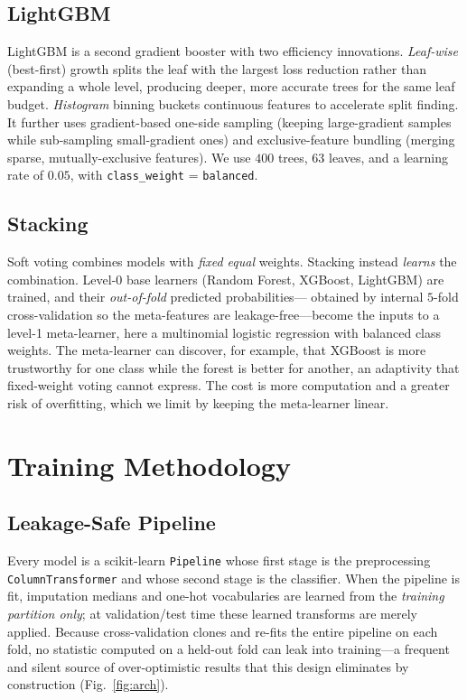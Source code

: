 \documentclass[conference]{IEEEtran}
\begin{document}
\subsection{LightGBM}
LightGBM is a second gradient booster with two efficiency innovations.
\emph{Leaf-wise} (best-first) growth splits the leaf with the largest loss
reduction rather than expanding a whole level, producing deeper, more accurate
trees for the same leaf budget. \emph{Histogram} binning buckets continuous
features to accelerate split finding. It further uses gradient-based one-side
sampling (keeping large-gradient samples while sub-sampling small-gradient ones)
and exclusive-feature bundling (merging sparse, mutually-exclusive features). We
use $400$ trees, $63$ leaves, and a learning rate of $0.05$, with
\texttt{class\_weight} = \texttt{balanced}.

\subsection{Stacking}
Soft voting combines models with \emph{fixed equal} weights. Stacking instead
\emph{learns} the combination. Level-0 base learners (Random Forest, XGBoost,
LightGBM) are trained, and their \emph{out-of-fold} predicted probabilities---
obtained by internal $5$-fold cross-validation so the meta-features are
leakage-free---become the inputs to a level-1 meta-learner, here a multinomial
logistic regression with balanced class weights. The meta-learner can discover,
for example, that XGBoost is more trustworthy for one class while the forest is
better for another, an adaptivity that fixed-weight voting cannot express. The
cost is more computation and a greater risk of overfitting, which we limit by
keeping the meta-learner linear.

\section{Training Methodology}
\subsection{Leakage-Safe Pipeline}
\label{sec:leak}
Every model is a scikit-learn \texttt{Pipeline} whose first stage is the
preprocessing \texttt{ColumnTransformer} and whose second stage is the classifier.
When the pipeline is fit, imputation medians and one-hot vocabularies are learned
from the \emph{training partition only}; at validation/test time these learned
transforms are merely applied. Because cross-validation clones and re-fits the
entire pipeline on each fold, no statistic computed on a held-out fold can leak
into training---a frequent and silent source of over-optimistic results that this
design eliminates by construction (Fig.~\ref{fig:arch}).
\end{document}
